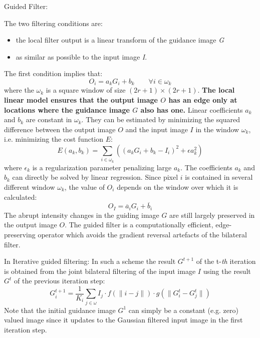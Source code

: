 Guided Filter: 

The two filtering conditions are:
\begin{itemize}
\item the local filter output is a linear transform of the guidance image \textit{G}
\item as similar as possible to the input image \textit{I}.
\end{itemize}
The first condition implies that:
\begin{displaymath}
O_i = a_kG_i + b_k \qquad \forall i \in \omega_k
\end{displaymath}
where the $\omega_k$ is a square window of size $(2r + 1) \times (2r+1)$. {\bfseries The local linear model ensures that the output image $O$ has an edge only at locations where the guidance image $G$ also has one.} Linear coefficients $a_k$ and $b_k$ are constant in $\omega_k$. They can be estimated by minimizing the squared difference between the output image $O$ and the input image $I$ in the window $\omega_k$, i.e. minimizing the cost function $E$:
\begin{displaymath}
E(a_k, b_k) = \sum_{i \in \omega_k}\left((a_kG_i + b_k - I_i)^2 + \epsilon a_k^2 \right)
\end{displaymath}
where $\epsilon_k$ is a regularization parameter penalizing large $a_k$. The coefficients $a_k$ and $b_k$ can directly be solved by linear regression. Since pixel $i$ is contained in several different window $\omega_k$, the value of $O_i$ depends on the window over which it is calculated:
\begin{displaymath}
O_I = \overline{a}_i G_i + \overline{b}_i
\end{displaymath}
The abrupt intensity changes in the guiding image $G$ are still largely preserved in the output image $O$. The guided filter is a computationally efficient, edge-preserving operator which avoids the gradient reversal artefacts of the bilateral filter. 

In Iterative guided filtering: In such a scheme the result $G^{t+1}$ of the t-\textit{th} iteration is obtained from the joint bilateral filtering of the input image $I$ using the result $G^t$ of the previous iteration step:
\begin{displaymath}
G^{t+1}_i = \frac{1}{K_i}\sum_{j \in \omega}I_j \cdot f(\parallel i - j \parallel) \cdot g(\parallel G^t_i - G^t_j \parallel )
\end{displaymath}
Note that the initial guidance image $G^1$ can simply be a constant (e.g. zero) valued image since it updates to the Gaussian filtered input image in the first iteration step.

